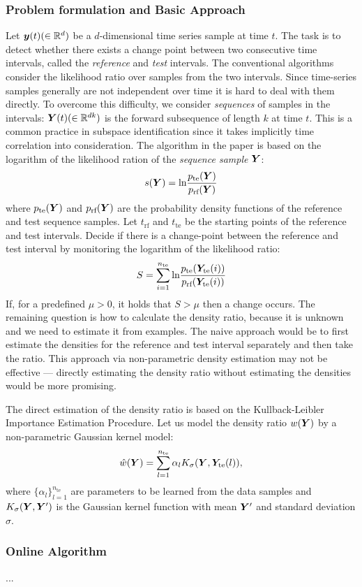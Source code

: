 \subsubsection{Problem formulation and Basic Approach}
Let $\vectorsym{y}(t) (\in \mathbb{R}^d)$ be a $d$-dimensional time series sample at time $t$.
The task is to detect whether there exists a change point between two consecutive time intervals, called the \emph{reference} and \emph{test} intervals.
The conventional algorithms consider the likelihood ratio over samples from the two intervals.
Since time-series samples generally are not independent over time it is hard to deal with them directly.
To overcome this difficulty, we consider \emph{sequences} of samples in the intervals: $\matrixsym{Y}(t)(\in \mathbb{R}^{dk})$ is the forward subsequence of length $k$ at time $t$.
This is a common practice in subspace identification since it takes implicitly time correlation into consideration.
The algorithm in the paper is based on the logarithm of the likelihood ration of the \emph{sequence sample} $\matrixsym{Y}$:
\begin{equation}
  s(\matrixsym{Y}) = \text{ln}\frac{p_\text{te}(\matrixsym{Y})}{p_\text{rf}(\matrixsym{Y})}
\end{equation}
where $p_{\text{te}}(\matrixsym{Y})$ and $p_{\text{rf}}(\matrixsym{Y})$ are the probability density functions of the reference and test sequence samples.
Let $t_{\text{rf}}$ and $t_{\text{te}}$ be the starting points of the reference and test intervals.
Decide if there is a change-point between the reference and test interval by monitoring the logarithm of the likelihood ratio:
\begin{equation}
  S = \sum_{i=1}^{n_\text{te}} \text{ln} \frac{p_{\text{te}}(\matrixsym{Y}_\text{te}(i))}{p_\text{rf}(\matrixsym{Y}_\text{te}(i))}
\end{equation}
If, for a predefined $\mu > 0$, it holds that $S > \mu$ then a change occurs.
The remaining question is how to calculate the density ratio, because it is unknown and we need to estimate it from examples.
The naive approach would be to first estimate the densities for the reference and test interval separately and then take the ratio.
This approach via non-parametric density estimation may not be effective --- directly estimating the density ratio without estimating the densities would be more promising.

The direct estimation of the density ratio is based on the Kullback-Leibler Importance Estimation Procedure.
Let us model the density ratio $w(\matrixsym{Y})$ by a non-parametric Gaussian kernel model:
\begin{equation}
  \hat{w}(\matrixsym{Y}) = \sum_{l=1}^{n_\text{te}} \alpha_l K_\sigma(\matrixsym{Y}, \matrixsym{Y}_\text{te}(l)),
\end{equation}
where $\{\alpha_l\}_{l=1}^{n_\text{te}}$ are parameters to be learned from the data samples and $K_\sigma(\matrixsym{Y}, \matrixsym{Y}')$ is the Gaussian kernel function with mean $\matrixsym{Y}'$ and standard deviation $\sigma$.

\subsubsection{Online Algorithm}
...